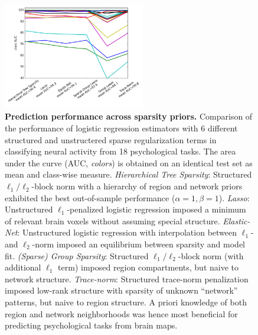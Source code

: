 \documentclass{article}
\begin{document}
\begin{figure}
\begin{centering}
\includegraphics[width=0.55\textwidth]{../figures/ROC_ALL.png}
\vspace{-0.4cm}
\caption{\textbf{Prediction performance across sparsity priors.}
Comparison of the performance of logistic regression estimators
with 6 different structured and unstructered
sparse regularization terms
in classifying neural activity from 18 psychological tasks.
The area under the curve (AUC, \textit{colors})
is obtained on an identical test set
as mean and class-wise measure.
%
\textit{Hierarchical Tree Sparsity}: Structured
$\ell_1/\ell_2$-block norm with a hierarchy of
region and network priors
exhibited the best out-of-sample performance
($\alpha = 1, \beta = 1$).
\textit{Lasso}: Unstructured $\ell_1$-penalized logistic regression
imposed a minimum of relevant brain voxels without
assuming special structure.
\textit{Elastic-Net}: Unstructured logistic regression
with interpolation between $\ell_1$- and $\ell_2$-norm 
imposed an equilibrium between sparsity and model fit.
\textit{(Sparse) Group Sparsity}: Structured $\ell_1/\ell_2$-block
norm (with additional $\ell_1$ term)
imposed region compartments, but naive to network structure.
\textit{Trace-norm}: Structured trace-norm penalization
imposed low-rank structure
with sparsity of unknown ``network'' patterns,
but naive to region structure.
%
A priori knowledge of both region and network neighborhoods
was hence most beneficial for predicting psychological tasks from
brain maps.
}
\end{centering}
\label{Tab:fig_sparsities}
\end{figure}


\end{document}
